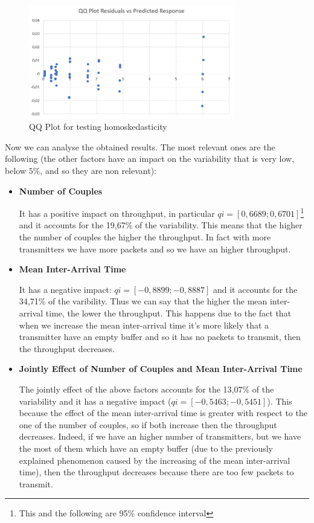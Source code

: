 \begin{figure}[H]
	\centering
	\includegraphics[width=0.8\textwidth]{img/homoskedasticity_2kr_throughput.png}
	\caption{QQ Plot for testing homoskedasticity}
	\label {img: homoskedasticity_throughput}
\end{figure}

\noindent Now we can analyse the obtained results. The most relevant ones are the following (the other factors have an impact on the variability that is very low, below $5\%$, and so they are non relevant):

\begin{itemize}
	\item \textbf{Number of Couples}
	
	\noindent It has a positive impact on throughput, in particular $qi = [0,6689; 0,6701]$\footnote{This and the following are 95\% confidence interval} and it accounts for the 19,67\% of the variability. This means that the higher the number of couples the higher the throughput. In fact with more transmitters we have more packets and so we have an higher throughput.
	 
	\item \textbf{Mean Inter-Arrival Time}
	
	\noindent It has a negative impact: $qi = [-0,8899; -0,8887]$ and it accounts for the 34,71\% of the varibility. Thus we can say that the higher the mean inter-arrival time, the lower the throughput. This happens due to the fact that when we increase the mean inter-arrival time it's more likely that a transmitter have an empty buffer and so it has no packets to transmit, then the throughput decreases. 
	
	\item \textbf{Jointly Effect of Number of Couples and Mean Inter-Arrival Time}
	
	\noindent The jointly effect of the above factors accounts for the 13,07\% of the variability and it has a negative impact ($qi = [-0,5463; -0,5451]$). This because the effect of the mean inter-arrival time is greater with respect to the one of the number of couples, so if both increase then the throughput decreases. Indeed, if we have an higher number of transmitters, but we have the most of them which have an empty buffer (due to the previously explained phenomenon caused by the increasing of the mean inter-arrival time), then the throughput decreases because there are too few packets to transmit.
\end{itemize}

